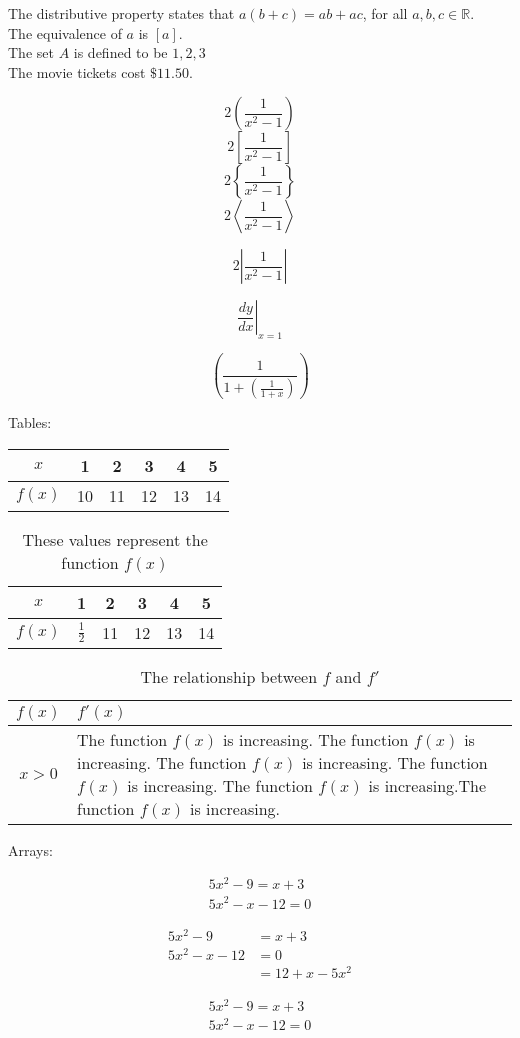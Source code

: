 \documentclass[11pt]{article}
\begin{document}
The distributive property states that $a(b+c) = ab + ac$, for all $a,b,c \in \mathbb{R}$. \\ [6pt]
The equivalence of $a$ is $[a]$. \\ [6pt]
The set $A$ is defined to be ${1, 2, 3}$ \\ [6pt]
The movie tickets cost $\$11.50$.

$$2\left(\frac{1}{{x^2}-1}\right)$$
$$2\left[\frac{1}{{x^2}-1}\right]$$
$$2\left\{\frac{1}{{x^2}-1}\right\}$$
$$2\left    \langle  \frac{1}{{x^2}-1}\right  \rangle     $$

$$2\left   |  \frac{1}{{x^2}-1}\right  |     $$

$$ \left. \frac{dy}{dx} \right| _{x=1}   $$

$$  \left(\frac{1}{1+\left( \frac{1}{1+x} \right)} \right)  $$



Tables:\\

\begin{tabular}{|c||c|c|c|c|c|}

\hline
$x$ & 1 & 2 & 3 & 4 & 5 \\ \hline
$f(x)$ & 10 & 11 & 12 & 13 & 14 \\ \hline
\end{tabular}


\vspace{1cm}



\begin{table}[H]
\centering
\def \arraystretch{1.5}
\begin{tabular}{|c||c|c|c|c|c|}
\hline
$x$ & 1 & 2 & 3 & 4 & 5 \\ \hline
$f(x)$ & $\frac{1}{2}$ & 11 & 12 & 13 & 14 \\ \hline

\end{tabular}
\caption{These values represent the function $f(x)$}
\end{table}



\begin{table}[H]
\centering
\caption{The relationship between $f$ and $f'$}
\def \arraystretch{1.5}
\begin{tabular}{|c||p{2in}|}
\hline
$f(x)$ & $f'(x)$ \\ \hline
$x >0$ & The function $f(x)$ is increasing. The function $f(x)$ is increasing. The function $f(x)$ is increasing. The function $f(x)$ is increasing. The function $f(x)$ is increasing.The function $f(x)$ is increasing. \\ \hline

\end{tabular}
\end{table}



Arrays:

\begin{align}
5x^2 - 9 = x + 3  \\
5x^2 - x - 12 = 0 
\end{align}


\begin{align*}
5x^2 - 9 &= x + 3  \\
5x^2 - x - 12 &= 0\\
&= 12 + x - 5x^2
\end{align*}

\begin{align}
5x^2 - 9 = x + 3  \\
5x^2 - x - 12 = 0 
\end{align}
\end{document}
